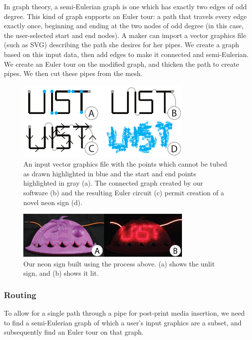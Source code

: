In graph theory, a semi-Eulerian graph is one which has exactly two edges of odd degree.  This kind of graph supports an Euler tour: a path that travels every edge exactly once, beginning and ending at the two nodes of odd degree (in this case, the user-selected start and end nodes).  A maker can import a vector graphics file (such as SVG) describing the path she desires for her pipes.  We create a graph based on this input data, then add edges to make it connected and semi-Eulerian.  We create an Euler tour on the modified graph, and thicken the path to create pipes.  We then cut these pipes from the mesh.

\begin{figure}[h!]
\centering
    \includegraphics[width=3.4in]{figures/interior.pdf}
\caption{An input vector graphics file with the points which cannot be tubed as drawn highlighted in {\color{blue}blue} and the start and end points highlighted in {\color{gray}gray} (a).  The connected graph created by our software (b) and the resulting Euler circuit (c) permit creation of a novel neon sign (d).}
\label{fig:tool-process-interior}
\end{figure}

\begin{figure}[h!]
\centering
    \includegraphics[width=3.4in]{figures/uistphotos.png}
\caption{Our neon sign built using the process above.  (a) shows the unlit sign, and (b) shows it lit.}
\label{fig:UIST}
\end{figure}

\subsubsection{Routing}
To allow for a single path through a pipe for post-print media insertion, we need to find a semi-Eulerian graph of which a user's input graphics are a subset, and subsequently find an Euler tour on that graph.

